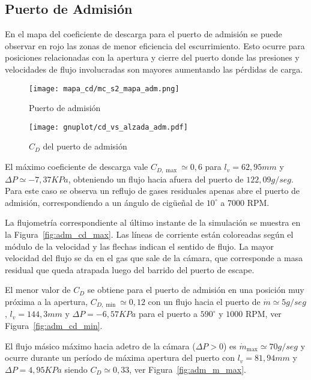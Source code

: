 \subsection{Puerto de Admisión}
%
En el mapa del coeficiente de descarga para el puerto de admisión se puede
observar en rojo las zonas de menor eficiencia del escurrimiento.
%
Esto ocurre para posiciones relacionadas con la apertura y cierre del puerto
donde las presiones y velocidades de flujo involucradas son mayores aumentando
las pérdidas de carga.

\begin{figure}[h]
    \centering
    \texttt{[image: mapa\_cd/mc\_s2\_mapa\_adm.png]}
    \caption{Puerto de admisión}\label{fig:mapa_cd_admision}
\end{figure}

\begin{figure}[h]
    \centering
    \texttt{[image: gnuplot/cd\_vs\_alzada\_adm.pdf]}
    \caption{$C_{D}$ del puerto de admisión}\label{fig:mapa_cd_admision}
\end{figure}

El máximo coeficiente de descarga vale $C_{D,\max}\simeq 0,6$ para
$l_{v}=62,95 mm$ y $\Delta P\simeq -7,37 KPa$, obteniendo un flujo hacia afuera
del puerto de $122,09 g/seg$.
%
Para este caso se observa un reflujo de gases residuales apenas abre el puerto
de admisión, correspondiendo a un ángulo de cigüeñal de $10^{\circ}$ a $7000$
RPM.

La flujometría correspondiente al último instante de la simulación se muestra en
la Figura~\ref{fig:adm_cd_max}.
%
Las líneas de corriente están coloreadas según el módulo de la velocidad y las
flechas indican el sentido de flujo.
%
La mayor velocidad del flujo se da en el gas que sale de la cámara, que
corresponde a masa residual que queda atrapada luego del barrido del puerto de
escape.

El menor valor de $C_{D}$ se obtiene para el puerto de admisión en una posición
muy próxima a la apertura, $C_{D,\min}\simeq 0,12$ con un flujo hacia el puerto
de $\dot{m}\simeq 5 g/seg$, $l_{v}=144,3 mm$ y $\Delta P=-6,57 KPa$ para el
puerto a $590^{\circ}$ y $1000$ RPM, ver Figura~\ref{fig:adm_cd_min}.

El flujo másico máximo hacia adetro de la cámara ($\Delta P>0$) es
$\dot{m}_{\max}\simeq 70 g/seg$ y ocurre durante un período de máxima apertura
del puerto con $l_{v}=81,94 mm$ y $\Delta P=4,95 KPa$ siendo $C_{D}\simeq 0,33$,
ver Figura~\ref{fig:adm_m_max}.

